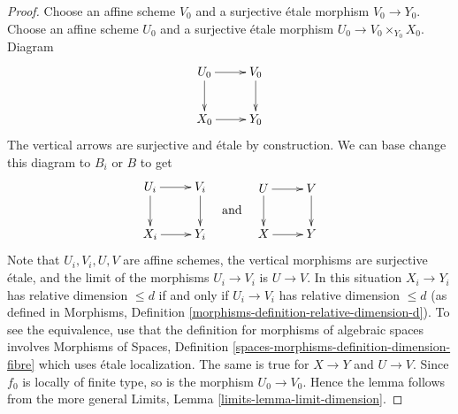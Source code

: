 \documentclass{stacks-project}
\theoremstyle{plain}
\theoremstyle{definition}
\theoremstyle{remark}
\numberwithin{equation}{subsection}
\begin{document}
\begin{proof}
Choose an affine scheme $V_0$ and a surjective \'etale morphism
$V_0 \to Y_0$. Choose an affine scheme $U_0$ and a surjective \'etale
morphism $U_0 \to V_0 \times_{Y_0} X_0$. Diagram
$$
\xymatrix{
U_0 \ar[d] \ar[r] & V_0 \ar[d] \\
X_0 \ar[r] & Y_0
}
$$
The vertical arrows are surjective and \'etale by construction.
We can base change this diagram to $B_i$ or $B$ to get
$$
\vcenter{
\xymatrix{
U_i \ar[d] \ar[r] & V_i \ar[d] \\
X_i \ar[r] & Y_i
}
}
\quad\text{and}\quad
\vcenter{
\xymatrix{
U \ar[d] \ar[r] & V \ar[d] \\
X \ar[r] & Y
}
}
$$
Note that $U_i, V_i, U, V$ are affine schemes,
the vertical morphisms are surjective \'etale, and the limit of the
morphisms $U_i \to V_i$ is $U \to V$.
In this situation $X_i \to Y_i$ has relative dimension $\leq d$
if and only if $U_i \to V_i$ has relative dimension $\leq d$
(as defined in Morphisms, Definition
\ref{morphisms-definition-relative-dimension-d}).
To see the equivalence, use that the definition for morphisms
of algebraic spaces involves Morphisms of Spaces, Definition
\ref{spaces-morphisms-definition-dimension-fibre}
which uses \'etale localization. The same is true for $X \to Y$ and $U \to V$.
Since $f_0$ is locally of finite type, so is the morphism $U_0 \to V_0$.
Hence the lemma follows from the more general
Limits, Lemma \ref{limits-lemma-limit-dimension}.
\end{proof}
\end{document}
